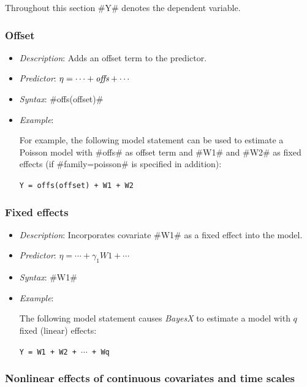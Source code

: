 Throughout this section #Y# denotes the dependent variable.

\subsubsection*{Offset}

\begin{itemize}
\item[] {\em Description}: Adds an offset term to the predictor.
\item[] {\em Predictor}: $\eta =  \cdots + \mbox{\it offs} + \cdots$
\item[] {\em Syntax}: #offs(offset)#
\item[] {\em Example}:

For example, the following model statement can be used to estimate
a Poisson model with #offs# as offset term and #W1# and #W2# as
fixed effects (if #family=poisson# is specified in addition):

\texttt{Y = offs(offset) + W1 + W2}

\end{itemize}

\subsubsection*{Fixed effects}

\begin{itemize}
\item[] {\em Description}: Incorporates covariate #W1# as a fixed effect into the model.
\item[] {\em Predictor}: $\eta =  \cdots + \gamma_1 W1 + \cdots$
\item[] {\em Syntax}: #W1#
\item[] {\em Example}:

The following model statement causes {\em BayesX} to estimate a
model with $q$ fixed (linear) effects:

\texttt{Y = W1 + W2 + $\cdots$ + Wq}
\end{itemize}

\subsubsection*{Nonlinear effects of continuous covariates and time
scales}


